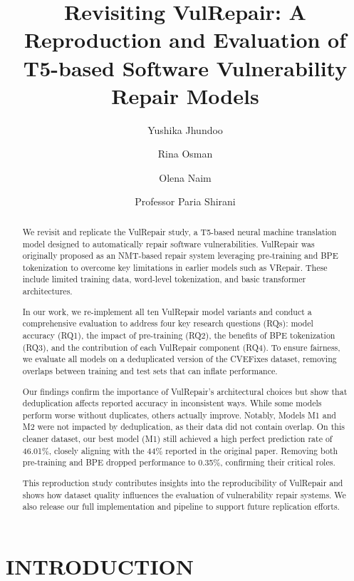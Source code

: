 \documentclass[sigconf,nonacm]{acmart}
\title{Revisiting VulRepair: A Reproduction and Evaluation of T5-based Software Vulnerability Repair Models}
\author{Yushika Jhundoo}
\affiliation{%
  \institution{University of Ottawa}
  \city{Ottawa}
  \country{Canada}
}
\author{Rina Osman}
\affiliation{%
  \institution{University of Ottawa}
  \city{Ottawa}
  \country{Canada}
}
\author{Olena Naim}
\affiliation{%
  \institution{University of Ottawa}
  \city{Ottawa}
  \country{Canada}
}
\author{Professor Paria Shirani}
\affiliation{%
  \institution{University of Ottawa}
  \city{Ottawa}
  \country{Canada}
}
\begin{document}
\begin{abstract}
We revisit and replicate the VulRepair study, a T5-based neural machine translation model designed to automatically repair software vulnerabilities. VulRepair was originally proposed as an NMT-based repair system leveraging pre-training and BPE tokenization to overcome key limitations in earlier models such as VRepair. These include limited training data, word-level tokenization, and basic transformer architectures.

In our work, we re-implement all ten VulRepair model variants and conduct a comprehensive evaluation to address four key research questions (RQs): model accuracy (RQ1), the impact of pre-training (RQ2), the benefits of BPE tokenization (RQ3), and the contribution of each VulRepair component (RQ4). To ensure fairness, we evaluate all models on a deduplicated version of the CVEFixes dataset, removing overlaps between training and test sets that can inflate performance.

Our findings confirm the importance of VulRepair’s architectural choices but show that deduplication affects reported accuracy in inconsistent ways. While some models perform worse without duplicates, others actually improve. Notably, Models M1 and M2 were not impacted by deduplication, as their data did not contain overlap. On this cleaner dataset, our best model (M1) still achieved a high perfect prediction rate of 46.01\%, closely aligning with the 44\% reported in the original paper. Removing both pre-training and BPE dropped performance to 0.35\%, confirming their critical roles.

This reproduction study contributes insights into the reproducibility of VulRepair and shows how dataset quality influences the evaluation of vulnerability repair systems. We also release our full implementation and pipeline to support future replication efforts.
\end{abstract}




\maketitle

\section{INTRODUCTION}

\end{document}
